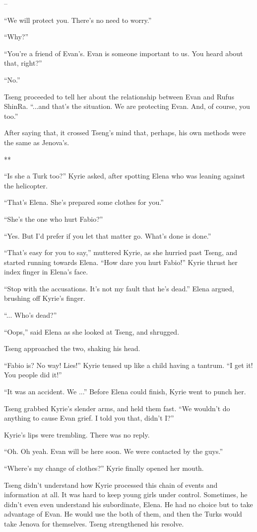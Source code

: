 \documentclass[oneside]{book}
\begin{document}
–

“We will protect you. There’s no need to worry.”

“Why?”

“You’re a friend of Evan’s. Evan is someone important to us. You heard about that, right?”

“No.”

Tseng proceeded to tell her about the relationship between Evan and Rufus ShinRa. “...and that’s the situation. We are protecting Evan. And, of course, you too.”

After saying that, it crossed Tseng’s mind that, perhaps, his own methods were the same as Jenova’s.

**

“Is she a Turk too?” Kyrie asked, after spotting Elena who was leaning against the helicopter.

“That’s Elena. She’s prepared some clothes for you.”

“She’s the one who hurt Fabio?”

“Yes. But I’d prefer if you let that matter go. What’s done is done.”

“That’s easy for you to say,” muttered Kyrie, as she hurried past Tseng, and started running towards Elena. “How dare you hurt Fabio!” Kyrie thrust her index finger in Elena’s face.

“Stop with the accusations. It’s not my fault that he’s dead.” Elena argued, brushing off Kyrie’s finger.

“... Who’s dead?”

“Oops,” said Elena as she looked at Tseng, and shrugged.

Tseng approached the two, shaking his head.

“Fabio is? No way! Lies!” Kyrie tensed up like a child having a tantrum. “I get it! You people did it!”

“It was an accident. We ...” Before Elena could finish, Kyrie went to punch her.

Tseng grabbed Kyrie’s slender arms, and held them fast. “We wouldn’t do anything to cause Evan grief. I told you that, didn’t I?”

Kyrie’s lips were trembling. There was no reply.

“Oh. Oh yeah. Evan will be here soon. We were contacted by the guys.”

“Where’s my change of clothes?” Kyrie finally opened her mouth.

Tseng didn’t understand how Kyrie processed this chain of events and information at all. It was hard to keep young girls under control. Sometimes, he didn’t even even understand his subordinate, Elena. He had no choice but to take advantage of Evan. He would use the both of them, and then the Turks would take Jenova for themselves. Tseng strengthened his resolve.
\end{document}
